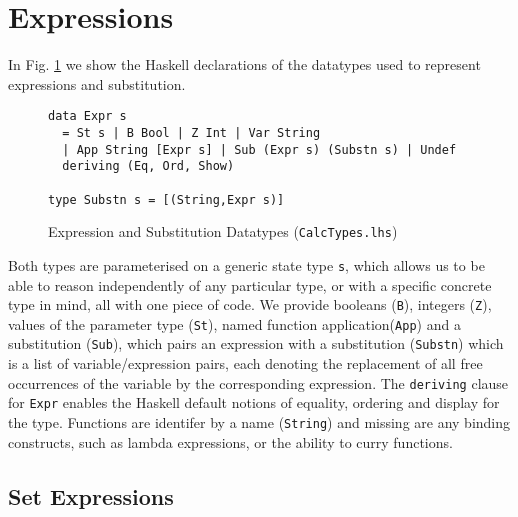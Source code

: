 \section{Expressions}\label{sec:Expressions}

In Fig. \ref{fig:expr-types} we show the Haskell declarations
of the datatypes used to represent expressions and substitution.
\begin{figure}[tb]
\begin{verbatim}
data Expr s
  = St s | B Bool | Z Int | Var String
  | App String [Expr s] | Sub (Expr s) (Substn s) | Undef
  deriving (Eq, Ord, Show)

type Substn s = [(String,Expr s)]
\end{verbatim}
  \caption{Expression and Substitution Datatypes (\texttt{CalcTypes.lhs})}
  \label{fig:expr-types}
\end{figure}
Both types are parameterised on a generic state type \texttt{s},
which allows us to be able to reason independently of any particular type, or with a specific concrete type in mind,
all with one piece of code.
We provide booleans (\texttt{B}),
integers (\texttt{Z}),
values of the parameter type (\texttt{St}),
named function application(\texttt{App})
and a substitution (\texttt{Sub}), which pairs an expression
with a substitution (\texttt{Substn}) which is a list of variable/expression pairs, each denoting the replacement of all free
occurrences of the variable by the corresponding expression.
The \texttt{deriving} clause for \texttt{Expr} enables the Haskell default notions
of equality, ordering and display for the type.
Functions are identifer by a name (\texttt{String})
and missing are any binding constructs, such as lambda expressions,
or the ability to curry functions.

\subsection{Set Expressions}

